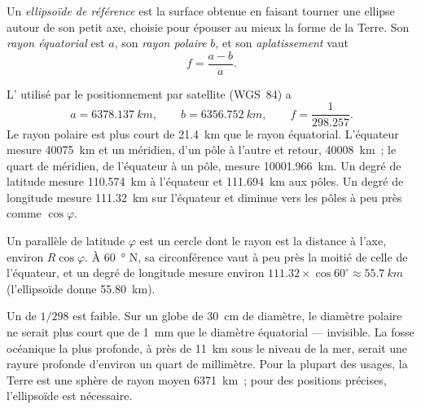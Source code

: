 \begin{definition}\label{def:g10:measuring-the-earth:ellipsoid}
Un \emph{ellipsoïde de référence}
est la surface obtenue en faisant tourner une ellipse autour de son petit
axe, choisie pour épouser au mieux la forme de la Terre. Son \emph{rayon
équatorial} est $a$, son \emph{rayon polaire} $b$, et son
\emph{aplatissement} vaut
\[
  f = \frac{a-b}{a}.
\]
\end{definition}

\begin{proposition}\label{prop:g10:measuring-the-earth:dimensions}
L' utilisé par le positionnement par satellite (WGS~84) a
\[
  a = \qty{6378.137}{km}, \qquad b = \qty{6356.752}{km}, \qquad
  f = \frac{1}{298.257}.
\]
Le rayon polaire est plus court de \qty{21.4}{km} que le rayon équatorial.
L'équateur mesure \qty{40075}{km} et un méridien, d'un pôle à l'autre et
retour, \qty{40008}{km}~; le quart de méridien, de l'équateur à un pôle,
mesure \qty{10001.966}{km}. Un degré de latitude mesure \qty{110.574}{km} à
l'équateur et \qty{111.694}{km} aux pôles. Un degré de longitude mesure
\qty{111.32}{km} sur l'équateur et diminue vers les pôles à peu près comme
$\cos \varphi$.
\end{proposition}

\begin{example}\label{ex:g10:measuring-the-earth:longitude}
Un parallèle de latitude $\varphi$ est un cercle dont le rayon est la
distance à l'axe, environ $R \cos \varphi$. À \qty{60}{\degree} N, sa
circonférence vaut à peu près la moitié de celle de l'équateur, et un degré
de longitude mesure environ $111.32 \times \cos 60^\circ \approx \qty{55.7}{km}$
(l'ellipsoïde donne \qty{55.80}{km}).
\end{example}

\begin{remark}\label{rem:g10:measuring-the-earth:round}
Un  de $1/298$ est faible. Sur un globe de \qty{30}{cm} de
diamètre, le diamètre polaire ne serait plus court que de \qty{1}{mm} que
le diamètre équatorial --- invisible. La fosse océanique la plus profonde,
à près de \qty{11}{km} sous le niveau de la mer, serait une rayure profonde
d'environ un quart de millimètre. Pour la plupart des usages, la Terre est
une sphère de rayon moyen \qty{6371}{km}~; pour des positions précises,
l'ellipsoïde est nécessaire.
\end{remark}


